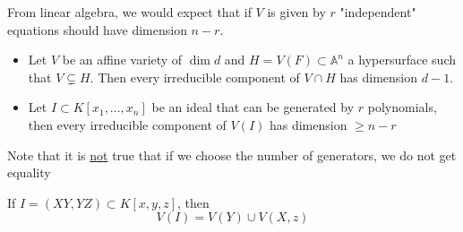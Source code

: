 \documentclass[../main.tex]{subfiles}
\begin{document}
From linear algebra, we would expect that if $V$ is given by $r$ "independent" equations should have dimension $n-r$.
\begin{propo}
	\begin{itemize}
	\item 
	Let $V$ be an affine variety of $\dim d$ and $H = V( F) \subset \mathbb{A}^{n}$ a hypersurface such that $V \subsetneq H$. Then every irreducible component of $V \cap H$ has dimension $d-1$.\\

\item Let $I \subset K[x_1,\ldots,x_n]$ be an ideal that can be generated by $r$ polynomials, then every irreducible component of $V( I) $ has dimension $ \geq n-r$ 

	\end{itemize}
\end{propo}
Note that it is \underline { not} true that if we choose the number of generators, we do not get equality
\begin{exemple}
	If $ I = ( XY,YZ) \subset K[x,y,z]$, then
	\[ 
	V( I) = V( Y) \cup V( X,z) 
	\]
	
\end{exemple}






				

					
\end{document}
